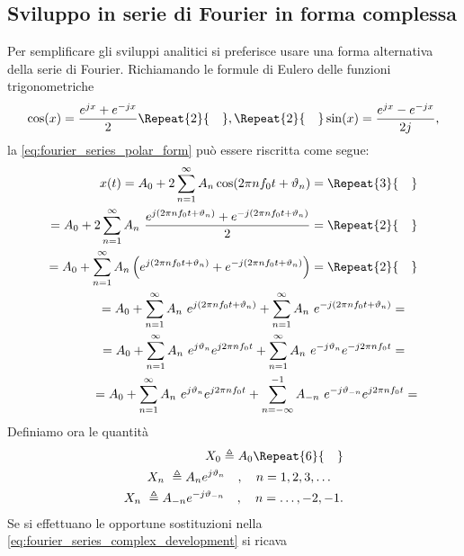 \documentclass[12pt,oneside,openany]{memoir}
\numberwithin{equation}{subsection}
\newcommand{\quads}[1]{\Repeat{#1}{\quad}}
\begin{document}
\subsection{Sviluppo in serie di Fourier in forma complessa}
Per semplificare gli sviluppi analitici si preferisce usare una forma
alternativa della serie di Fourier. Richiamando le formule di Eulero delle
funzioni trigonometriche
\begin{equation}
	\cos(x) = \frac{e^{jx} + e^{-jx}}{2} \quads{2} , \quads{2} \sin(x) =
	\frac{e^{jx} - e^{-jx}}{2j},
\end{equation}
la \eqref{eq:fourier_series_polar_form} pu\`o essere riscritta come segue:
\begin{equation}\label{eq:fourier_series_complex_development}
\begin{split}
	x(t) = A_0 + 2 \sum_{n = 1}^{\infty} A_n
	\cos(2 \pi n f_0 t + \vartheta_n) =
	\quads{3}
	\\
	= A_0 + 2 \sum_{n = 1}^{\infty} A_n \ 
	\frac{e^{j(2 \pi n f_0 t + \vartheta_n)} + 
	e^{-j(2 \pi n f_0 t + \vartheta_n)}}{2} =
	\quads{2}
	\\
	= A_0 + \sum_{n = 1}^{\infty} A_n \left(
		e^{j(2 \pi n f_0 t + \vartheta_n)} + 
		e^{-j(2 \pi n f_0 t + \vartheta_n)}
	\right) =
	\quads{2}
	\\
	= A_0 + \sum_{n = 1}^{\infty} A_n \ e^{j(2 \pi n f_0 t + \vartheta_n)} +
	\sum_{n = 1}^{\infty} A_n \ e^{-j(2 \pi n f_0 t + \vartheta_n)} =
	\quad
	\\
	= A_0 + \sum_{n = 1}^{\infty} A_n \ e^{j\vartheta_n}e^{j 2 \pi n f_0 t}
	+ \sum_{n = 1}^{\infty} A_n \ e^{-j\vartheta_n}e^{-j 2 \pi n f_0 t} =
	\quad
	\\
	= A_0 + \sum_{n = 1}^{\infty} A_n \ e^{j\vartheta_n}e^{j 2 \pi n f_0 t}
	+ \sum_{n = -\infty}^{-1} A_{-n} \ 
	e^{-j\vartheta_{-n}}e^{j 2 \pi n f_0 t} =
\end{split}
\end{equation}
Definiamo ora le quantit\`a
\begin{equation}
\begin{split}
	X_0 \triangleq A_0
	\quads{6}
	\\
	X_n \ \triangleq A_n e^{j \vartheta_n} \quad , \quad n = 1, 2, 3, \dots
	\quad
	\\
	X_n \ \triangleq A_{-n} e^{-j \vartheta_{-n}} \quad , \quad n = \dots , 
	-2, -1.
\end{split}
\end{equation}
Se si effettuano le opportune sostituzioni nella
\eqref{eq:fourier_series_complex_development} si ricava
\end{document}
